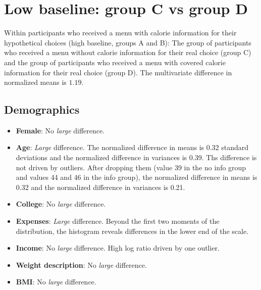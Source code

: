 \documentclass[12pt]{article}
\begin{document}
\clearpage


\section{Low baseline: group C vs group D}

Within participants who received a menu with calorie information for their hypothetical choices (high baseline, groups A and B): The group of participants who received a menu without calorie information for their real choice (group C) and the group of participants who received a menu with covered calorie information for their real choice (group D). The multivariate difference in normalized means is $1.19$.

\subsection{Demographics}

\begin{itemize}
  \item \textbf{Female}: No \emph{large} difference.

  \item \textbf{Age}: \emph{Large} difference.
  The normalized difference in means is 0.32 standard deviations and the normalized difference in variances is 0.39. Ths difference is not driven by outliers. After dropping them (value 39 in the no info group and values 44 and 46 in the info group), the normalized difference in means is 0.32 and the normalized difference in variances is 0.21.

  \item \textbf{College}: No \emph{large} difference.

  \item \textbf{Expenses}: \emph{Large} difference.
  Beyond the first two moments of the distribution, the histogram reveals differences in the lower end of the scale.

  \item \textbf{Income}: No \emph{large} difference.
  High log ratio driven by one outlier.

  \item \textbf{Weight description}: No \emph{large} difference.

  \item \textbf{BMI}: No \emph{large} difference.
\end{itemize}
\end{document}
